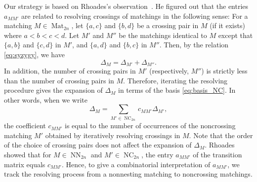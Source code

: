 \documentclass[reqno,12pt]{amsart}
\theoremstyle{definition}
\theoremstyle{remark}
\newcommand\NC{\operatorname{NC}}
\newcommand\NN{\operatorname{NN}}
\newcommand\Mat{\operatorname{Mat}}
\begin{document}
Our strategy is based on Rhoades's observation~\cite{Rho19}.
He figured out that the entries \( a_{MM'} \) are related to resolving crossings
of matchings in the following sense:
For a matching \( M\in\Mat_{2n} \), let \( \{ a,c \} \) and \( \{ b,d \} \) be
a crossing pair in \( M \) (if it exists) where \( a<b<c<d \).
Let \( M' \) and \( M'' \) be the matchings identical to \( M \) except that
\( \{ a,b \} \) and \( \{ c,d \} \) in \( M' \), and
\( \{ a,d \} \) and \( \{ b,c \} \) in \( M'' \).
Then, by the relation \eqref{eq:syzygy}, we have
\begin{equation}\label{Eq: web relation}
  \Delta_M = \Delta_{M'} + \Delta_{M''}.
\end{equation}
In addition, the number of crossing pairs in \( M' \) (respectively, \( M'' \)) is
strictly less than the number of crossing pairs in \( M \).
Therefore, iterating the resolving procedure gives the expansion of \( \Delta_M \)
in terms of the basis \eqref{eq:basis_NC}.
In other words, when we write 
\begin{equation} \label{eq: web expansion}
  \Delta_M = \sum_{M'\in\NC_{2n}}c_{MM'} \Delta_{M'},
\end{equation}
the coefficient \( c_{MM'} \) is equal to
the number of occurrences of the noncrossing matching \( M' \)
obtained by iteratively resolving crossings in \( M \).
Note that the order of the choice of crossing pairs does not affect the expansion of \( \Delta_M \).
Rhoades showed that for \( M\in\NN_{2n} \) and \( M'\in\NC_{2n} \),
the entry \( a_{MM'} \) of the transition matrix equals \( c_{MM'} \).
Hence, to give a combinatorial interpretation of \( a_{MM'} \), we track
the resolving process from a nonnesting matching to noncrossing matchings.
\end{document}
